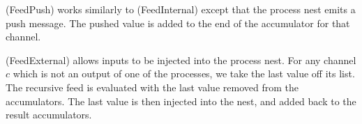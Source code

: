 (FeedPush) works similarly to (FeedInternal) except that the process nest emits a push message.
The pushed value is added to the end of the accumulator for that channel.

(FeedExternal) allows inputs to be injected into the process nest.
For any channel $c$ which is not an output of one of the processes, we take the last value off its list.
The recursive feed is evaluated with the last value removed from the accumulators.
The last value is then injected into the nest, and added back to the result accumulators.

